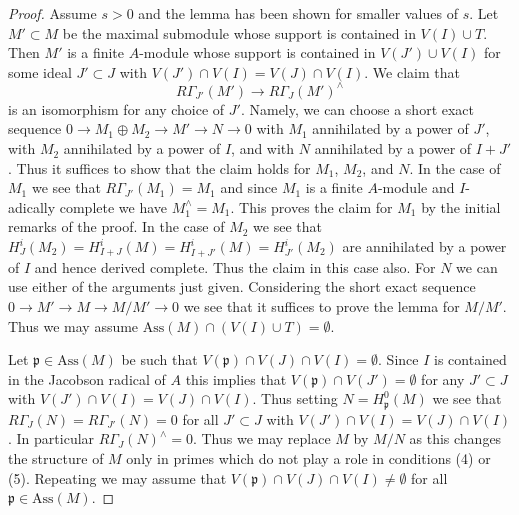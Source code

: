\documentclass[10pt,a4paper]{amsart}
\theoremstyle{plain}
\theoremstyle{definition}
\theoremstyle{remark}
\numberwithin{equation}{subsection}
\begin{document}
\begin{proof}
\medskip\noindent
Assume $s > 0$ and the lemma has been shown for smaller values of $s$.
Let $M' \subset M$ be the maximal submodule whose support is contained
in $V(I) \cup T$. Then $M'$ is a finite $A$-module whose support
is contained in $V(J') \cup V(I)$ for some ideal $J' \subset J$
with $V(J') \cap V(I) = V(J) \cap V(I)$.
We claim that
$$
R\Gamma_{J'}(M') \to R\Gamma_J(M')^\wedge
$$
is an isomorphism for any choice of $J'$.
Namely, we can choose a short exact sequence
$0 \to M_1 \oplus M_2 \to M' \to N \to 0$ with
$M_1$ annihilated by a power of $J'$, with $M_2$ annihilated
by a power of $I$, and with $N$ annihilated by a power of $I + J'$.
Thus it suffices to show that the claim holds for $M_1$, $M_2$, and $N$.
In the case of $M_1$ we see that $R\Gamma_{J'}(M_1) = M_1$ and
since $M_1$ is a finite $A$-module and $I$-adically complete
we have $M_1^\wedge = M_1$. This proves the claim for $M_1$
by the initial remarks of the proof. In the case of $M_2$ we see that
$H^i_J(M_2) = H^i_{I + J}(M) = H^i_{I + J'}(M) = H^i_{J'}(M_2)$
are annihilated by a power of $I$ and hence derived complete.
Thus the claim in this case also. For $N$ we can use either of
the arguments just given. Considering the short exact sequence
$0 \to M' \to M \to M/M' \to 0$
we see that it suffices to prove the lemma for $M/M'$.
Thus we may assume $\text{Ass}(M) \cap (V(I) \cup T) = \emptyset$.

\medskip\noindent
Let $\mathfrak p \in \text{Ass}(M)$ be such that
$V(\mathfrak p) \cap V(J) \cap V(I) = \emptyset$.
Since $I$ is contained in the Jacobson radical of $A$ this implies
that $V(\mathfrak p) \cap V(J') = \emptyset$ for any
$J' \subset J$ with $V(J') \cap V(I) = V(J) \cap V(I)$.
Thus setting $N = H^0_\mathfrak p(M)$ we see that
$R\Gamma_J(N) = R\Gamma_{J'}(N) = 0$ for all
$J' \subset J$ with $V(J') \cap V(I) = V(J) \cap V(I)$.
In particular $R\Gamma_J(N)^\wedge = 0$.
Thus we may replace $M$ by $M/N$ as this changes the
structure of $M$ only in primes which do not play
a role in conditions (4) or (5). Repeating we may assume that
$V(\mathfrak p) \cap V(J) \cap V(I) \not = \emptyset$
for all $\mathfrak p \in \text{Ass}(M)$.


\end{proof}
\end{document}
